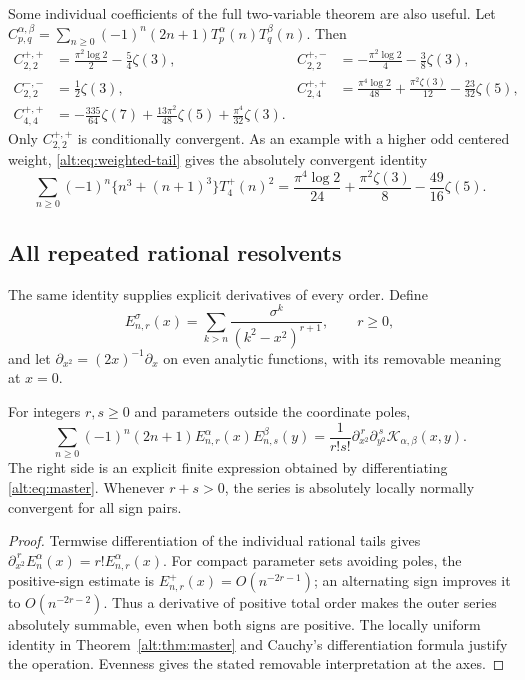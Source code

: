 Some individual coefficients of the full two-variable theorem are
also useful. Let
$C_{p,q}^{\alpha,\beta}=\sum_{n\ge0}(-1)^n(2n+1)
T_p^\alpha(n)T_q^\beta(n)$. Then
\begin{align}
 C_{2,2}^{+,+}&=\frac{\pi^2\log2}{2}-\frac54\zeta(3),
 & C_{2,2}^{+,-}&=-\frac{\pi^2\log2}{4}-\frac38\zeta(3),
 \label{alt:eq:coeff22}\\
 C_{2,2}^{-,-}&=\frac12\zeta(3),
 &C_{2,4}^{+,+}&=\frac{\pi^4\log2}{48}
                   +\frac{\pi^2\zeta(3)}{12}-\frac{23}{32}\zeta(5),
 \label{alt:eq:coeff24}\\
 C_{4,4}^{+,+}&=-\frac{335}{64}\zeta(7)
                 +\frac{13\pi^2}{48}\zeta(5)
                 +\frac{\pi^4}{32}\zeta(3).
 \label{alt:eq:coeff44}
\end{align}
Only $C_{2,2}^{+,+}$ is conditionally convergent. As an example with a
higher odd centered weight, \eqref{alt:eq:weighted-tail} gives the
absolutely convergent identity
\begin{equation}\label{alt:eq:cubicweight}
 \sum_{n\ge0}(-1)^n\{n^3+(n+1)^3\}T_4^+(n)^2
 =\frac{\pi^4\log2}{24}+\frac{\pi^2\zeta(3)}8
       -\frac{49}{16}\zeta(5).
\end{equation}

\subsection{All repeated rational resolvents}

The same identity supplies explicit derivatives of every order. Define
\[
 E_{n,r}^{\sigma}(x)=\sum_{k>n}
       \frac{\sigma^k}{(k^2-x^2)^{r+1}},\qquad r\ge0,
\]
and let $\partial_{x^2}=(2x)^{-1}\partial_x$ on even analytic
functions, with its removable meaning at $x=0$.

\begin{corollary}\label{alt:cor:derivatives}
For integers $r,s\ge0$ and parameters outside the coordinate poles,
\begin{equation}\label{alt:eq:derivatives}
 \sum_{n\ge0}(-1)^n(2n+1)
        E_{n,r}^{\alpha}(x)E_{n,s}^{\beta}(y)
 =\frac{1}{r!s!}
      \partial_{x^2}^{\,r}\partial_{y^2}^{\,s}
                         \mathcal K_{\alpha,\beta}(x,y).
\end{equation}
The right side is an explicit finite expression obtained by
differentiating \eqref{alt:eq:master}. Whenever $r+s>0$, the series
is absolutely locally normally convergent for all sign pairs.
\end{corollary}
\begin{proof}
Termwise differentiation of the individual rational tails gives
$\partial_{x^2}^{\,r}E_n^\alpha(x)=r!E_{n,r}^\alpha(x)$.
For compact parameter sets avoiding poles, the positive-sign estimate
is $E_{n,r}^+(x)=O(n^{-2r-1})$; an alternating sign improves it to
$O(n^{-2r-2})$. Thus a derivative of positive total order makes the
outer series absolutely summable, even when both signs are positive.
The locally uniform identity in Theorem~\ref{alt:thm:master} and
Cauchy's differentiation formula justify the operation. Evenness
gives the stated removable interpretation at the axes.
\end{proof}

